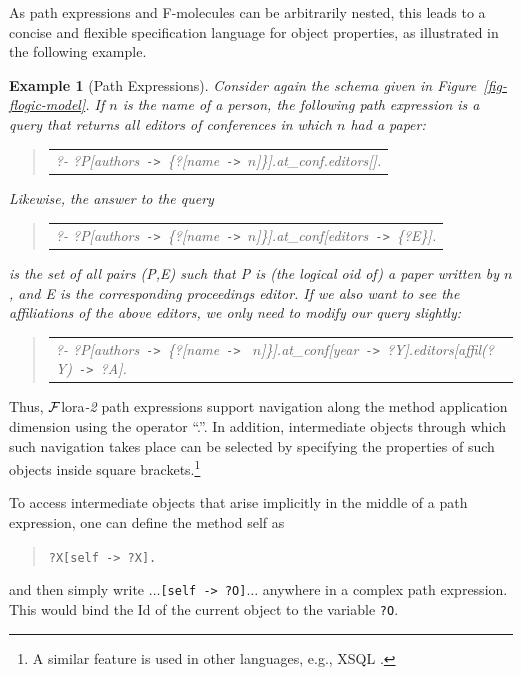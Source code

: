 \documentclass[11pt]{article}
\newtheorem{example}{Example}[section]
\newenvironment{qrules}{\begin{quote}\tt\begin{tabular}[t]{l}}%
{\end{tabular}\end{quote}}
\newcommand{\mvd}{{\mbox{\tt \,->\,}}}  %
\newcommand{\anon}{?}
\newcommand{\FLORA}{{\mbox{\sc ${\cal F}${lora}\rm\emph{-2}}}\xspace}
\begin{document}
As path expressions and F-molecules can be arbitrarily nested, this leads
to a concise and flexible specification language for object properties, as
illustrated in the following example.

\begin{example}[Path Expressions]\label{Ex:PathExpr}
  \rm Consider again the schema given in Figure~\ref{fig-flogic-model}.  If
  $n$ is the name of a person, the following path expression is a query
  that returns all editors of conferences in which $n$ had a paper:
  \begin{qrules}
   ?- ?P[authors\mvd\{\anon [name\mvd $n$]\}].at\_conf.editors[].
  \end{qrules}
  Likewise, the answer to the query
  \begin{qrules}
   ?- ?P[authors\mvd\{\anon [name\mvd $n$]\}].at\_conf[editors\mvd\{?E\}].
  \end{qrules}
  is the set of all pairs (\textsf{P},\textsf{E}) such that \textsf{P} is
  (the logical oid of) a paper written by $n$, and \textsf{E} is the
  corresponding proceedings editor.  If we also want to see the
  affiliations of the above editors, we only need to modify our query
  slightly:
  \begin{qrules}
   ?- ?P[authors\mvd\{\anon [name\mvd
    $n$]\}].at\_conf[year\mvd ?Y].editors[affil(?Y)\mvd ?A].
  \end{qrules}
\end{example}
Thus, \FLORA path expressions support navigation 
along the method application dimension using the operator
``.''.
In addition, intermediate objects through which such navigation
takes place can be selected by specifying the properties of such objects
inside square brackets.\footnote{
  A similar feature is used in other languages, e.g., XSQL \cite{xsql-92}.
  }

To access intermediate objects that arise implicitly in the middle
of a path expression, one can define the method \textsf{self} as
\begin{quote}
  {\tt ?X[self{\mvd}?X].} 
\end{quote}
and then simply write $\dots${\tt [self{\mvd}?O]}$\dots$ anywhere in a
complex path expression. This would bind the Id of the current object to
the variable {\tt ?O}.
\end{document}
